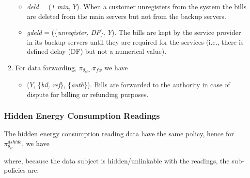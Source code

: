 \documentclass[a4paper]{article}
\begin{document}
\begin{enumerate}
\begin{itemize}
\item \textit{deld} = (\textit{1 min}, $Y$).  When a customer unregisters from the system the bills are deleted from the main servers but not from the backup servers. 

\item \textit{gdeld} = (\{\textit{unregister}, \textit{DF}\}, $Y$).  The  bills are kept by the service provider in its backup servers until they are required for the services (i.e., there is defined delay (DF) but not a numerical value).
\end{itemize}   

\item For data forwarding, $\pi_{\theta_{bill}}$.$\pi_{fw}$ we have  

\begin{itemize}
\item ($Y$, \{\textit{bil, ref}\}, \{\textit{auth}\}). Bills are forwarded to the authority in case of dispute for billing or refunding purposes.
\end{itemize}   

\end{enumerate} 


\subsubsection{Hidden Energy Consumption Readings} 
The hidden energy consumption reading data have the same policy, hence for $\pi^{dshide}_{\theta_{ec}}$, we have 

\begin{center}
\noindent{}
\end{center}  

where, because the data subject is hidden/unlinkable with the readings, the sub-policies are:  
\end{document}
